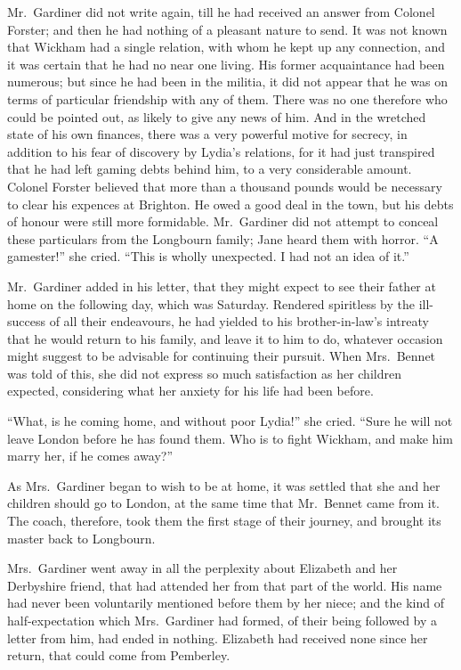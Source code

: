 Mr.\ Gardiner did not write again, till he had received
an answer from Colonel Forster; and then he had nothing
of a pleasant nature to send. It was not known that
Wickham had a single relation, with whom he kept up
any connection, and it was certain that he had no near
one living. His former acquaintance had been numerous;
but since he had been in the militia, it did not appear that
he was on terms of particular friendship with any of them.
There was no one therefore who could be pointed out, as
likely to give any news of him. And in the wretched state
of his own finances, there was a very powerful motive for
secrecy, in addition to his fear of discovery by Lydia’s
relations, for it had just transpired that he had left gaming
debts behind him, to a very considerable amount. Colonel
Forster believed that more than a thousand pounds would
be necessary to clear his expences at Brighton. He owed
a good deal in the town, but his debts of honour were still
more formidable. Mr.\ Gardiner did not attempt to conceal
these particulars from the Longbourn family; Jane heard
them with horror. “A gamester!” she cried. “This is
wholly unexpected. I had not an idea of it.”

Mr.\ Gardiner added in his letter, that they might expect
to see their father at home on the following day, which was
Saturday. Rendered spiritless by the ill-success of all
their endeavours, he had yielded to his brother-in-law’s
intreaty that he would return to his family, and leave it
to him to do, whatever occasion might suggest to be
advisable for continuing their pursuit. When Mrs.\ Bennet
was told of this, she did not express so much satisfaction
as her children expected, considering what her anxiety
for his life had been before.

“What, is he coming home, and without poor Lydia!”
she cried. “Sure he will not leave London before he has
found them. Who is to fight Wickham, and make him
marry her, if he comes away?”

As Mrs.\ Gardiner began to wish to be at home, it was
settled that she and her children should go to London,
at the same time that Mr.\ Bennet came from it. The
coach, therefore, took them the first stage of their journey,
and brought its master back to Longbourn.

Mrs.\ Gardiner went away in all the perplexity about
Elizabeth and her Derbyshire friend, that had attended
her from that part of the world. His name had never
been voluntarily mentioned before them by her niece;
and the kind of half-expectation which Mrs.\ Gardiner had
formed, of their being followed by a letter from him,
had ended in nothing. Elizabeth had received none since
her return, that could come from Pemberley.

